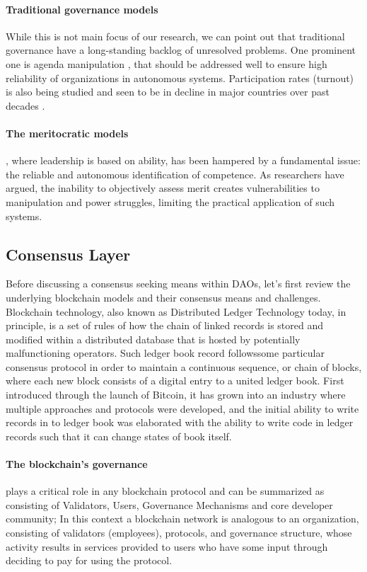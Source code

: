 \documentclass{article}
\begin{document}
\begin{CJK}{UTF8}{gbsn}
\begin{multicols}{2}
        \paragraph{Traditional governance models} While this is not main focus of our research, we can point out that traditional governance have a long-standing backlog of unresolved problems. One prominent one is agenda manipulation \cite{McKelvey1976}, that should be addressed well to ensure high reliability of organizations in autonomous systems. Participation rates (turnout) is also being studied and seen to be in decline in major countries over past decades \cite{Lawrence23}\cite{Filip24}. 
        \paragraph{The meritocratic models}, where leadership is based on ability, has been hampered by a fundamental issue: the reliable and autonomous identification of competence. As researchers have argued\cite{Arrow2000}, the inability to objectively assess merit creates vulnerabilities to manipulation and power struggles, limiting the practical application of such systems.


        \subsection{Consensus Layer}
        Before discussing a consensus seeking means within DAOs, let's first review the underlying blockchain models and their consensus means and challenges. Blockchain technology, also known as Distributed Ledger Technology today, in principle, is a set of rules of how the chain of linked records is stored and modified within a distributed database that is hosted by potentially malfunctioning operators.
        Such ledger book record followssome particular consensus protocol in order to maintain a continuous sequence, or chain of blocks\cite{Merlinda2019}, where each new block consists of a digital entry to a united ledger book. First introduced through the launch of Bitcoin\cite{Satoshi}, it has grown into an industry where multiple approaches and protocols were developed, and the initial ability to write records in to ledger book was elaborated with the ability to write code in ledger records such that it can change states of book itself.
         \paragraph{The blockchain's governance} plays a critical role in any blockchain protocol and can be summarized as consisting of Validators, Users, Governance Mechanisms and core developer community; In this context a blockchain network is analogous to an organization, consisting of validators (employees), protocols, and governance structure, whose activity results in services provided to users who have some input through deciding to pay for using the protocol.


\end{multicols}
\end{CJK}
\end{document}
